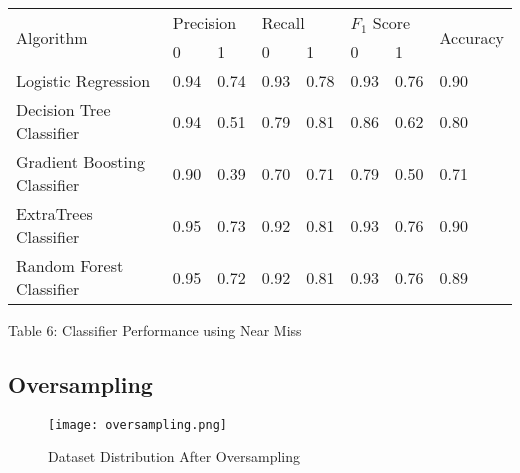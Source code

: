 \documentclass[12pt,letter-paper]{article}
\begin{document}
        \begin{table}[H]
    \begin{center}
        \begin{tabular}{|l|l|l|l|l|l|l|l|}
            \hline
            \multirow{2}{*}{Algorithm} & \multicolumn{2}{l|}{Precision} & \multicolumn{2}{l|}{Recall} & \multicolumn{2}{l|}{$F_1$ Score} & \multirow{2}{*}{Accuracy} \\ \cline{2-7}
                               & 0              & 1             & 0            & 1            & 0             & 1             &                           \\ \hline
        Logistic Regression         & 0.94           & 0.74          & 0.93         & 0.78         & 0.93          & 0.76          & 0.90                     \\ \hline
        Decision Tree Classifier         & 0.94           & 0.51          & 0.79         & 0.81         & 0.86          & 0.62          & 0.80                      \\ \hline
        Gradient Boosting Classifier & 0.90           & 0.39          & 0.70         & 0.71         & 0.79          & 0.50          & 0.71                      \\ \hline
        ExtraTrees Classifier       & 0.95           & 0.73          & 0.92         & 0.81         & 0.93          & 0.76          & 0.90                      \\ \hline
        Random Forest Classifier     & 0.95           & 0.72          & 0.92         & 0.81         & 0.93          & 0.76          & 0.89                      \\ \hline
        \end{tabular}
    \end{center}
    \begin{center}
    Table 6: Classifier Performance using Near Miss 
        \end{center}
    \end{table}
    
    \subsection{Oversampling}
        
            \begin{figure}[H]%
                \begin{center}
                    \texttt{[image: oversampling.png]}%
                        \caption{Dataset Distribution After Oversampling}  
                \end{center}
            \end{figure}
            
\end{document}

